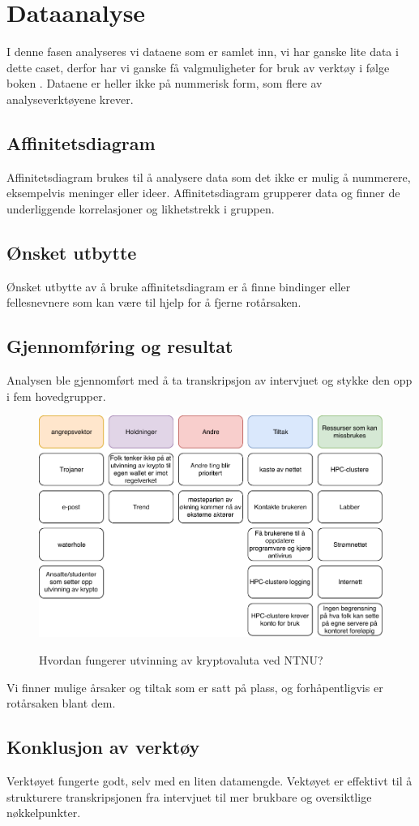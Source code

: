 \chapter{Dataanalyse}
I denne fasen analyseres vi dataene som er samlet inn, vi har ganske lite data i dette caset, derfor har vi ganske få valgmuligheter for bruk av verktøy i følge boken \cite{RCA}. Dataene er heller ikke på nummerisk form, som flere av analyseverktøyene krever.

\section{Affinitetsdiagram}
Affinitetsdiagram brukes til å analysere data som det ikke er mulig å nummerere, eksempelvis meninger eller ideer. Affinitetsdiagram grupperer data og finner de underliggende korrelasjoner og likhetstrekk i gruppen.


\section{Ønsket utbytte}
Ønsket utbytte av å bruke affinitetsdiagram er å finne bindinger eller fellesnevnere som kan være til hjelp for å fjerne rotårsaken. 

\section{Gjennomføring og resultat}
Analysen ble gjennomført med å ta transkripsjon av intervjuet og stykke den opp i fem hovedgrupper.     

\begin{figure}[H]
    \centering
    \includegraphics[scale=0.6]{case_3/bilder/AD.pdf}
    \label{fig:AD_miner}
    \caption[Analyse av intervju]{Hvordan fungerer utvinning av kryptovaluta ved NTNU?}
\end{figure}

Vi finner mulige årsaker og tiltak som er satt på plass, og forhåpentligvis er rotårsaken blant dem.

\section{Konklusjon av verktøy}
Verktøyet fungerte godt, selv med en liten datamengde. Vektøyet er effektivt til å strukturere transkripsjonen fra intervjuet til mer brukbare og oversiktlige nøkkelpunkter. 
